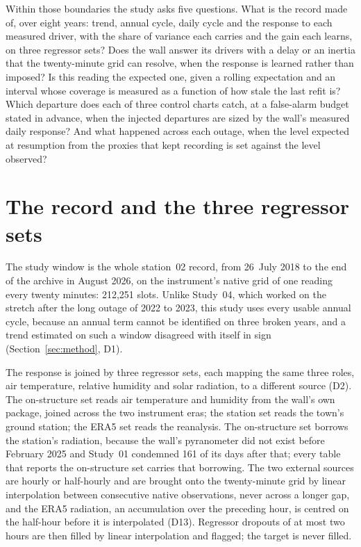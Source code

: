 \documentclass[11pt,a4paper]{article}
\begin{document}
Within those boundaries the study asks five questions. What is the record made
of, over eight years: trend, annual cycle, daily cycle and the response to each
measured driver, with the share of variance each carries and the gain each
learns, on three regressor sets? Does the wall answer its drivers with a delay
or an inertia that the twenty-minute grid can resolve, when the response is
learned rather than imposed? Is this reading the expected one, given a rolling
expectation and an interval whose coverage is measured as a function of how
stale the last refit is? Which departure does each of three control charts
catch, at a false-alarm budget stated in advance, when the injected departures
are sized by the wall's measured daily response? And what happened across each
outage, when the level expected at resumption from the proxies that kept
recording is set against the level observed?

\section{The record and the three regressor sets}
\label{sec:record}

The study window is the whole station~02 record, from 26~July 2018 to the end
of the archive in August 2026, on the instrument's native grid of one reading
every twenty minutes: 212,251 slots. Unlike Study~04, which worked on the stretch
after the long outage of 2022 to 2023, this study uses every usable annual
cycle, because an annual term cannot be identified on three broken years, and
a trend estimated on such a window disagreed with itself in sign
(Section~\ref{sec:method}, D1).

The response is joined by three regressor sets, each mapping the same three
roles, air temperature, relative humidity and solar radiation, to a different
source (D2). The on-structure set reads air temperature and humidity from the
wall's own package, joined across the two instrument eras; the station set
reads the town's ground station; the ERA5 set reads the reanalysis. The
on-structure set borrows the station's radiation, because the wall's
pyranometer did not exist before February 2025 and Study~01 condemned 161 of
its days after that; every table that reports the on-structure set carries
that borrowing. The two external sources are hourly or half-hourly and are
brought onto the twenty-minute grid by linear interpolation between
consecutive native observations, never across a longer gap, and the ERA5
radiation, an accumulation over the preceding hour, is centred on the
half-hour before it is interpolated (D13). Regressor dropouts of at most two
hours are then filled by linear interpolation and flagged; the target is never
filled.
\end{document}
